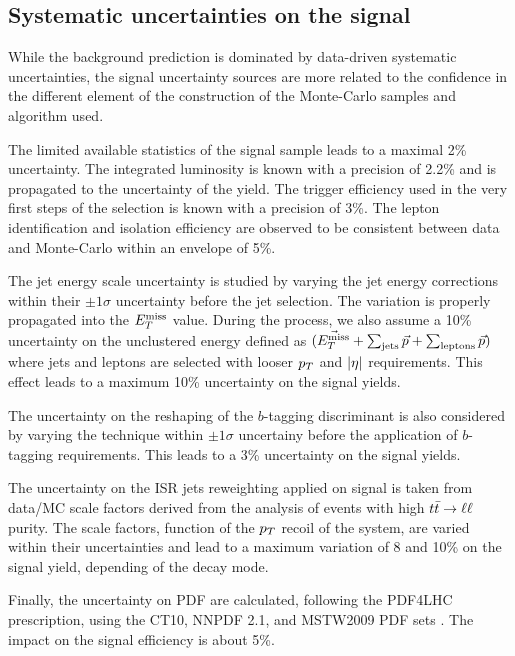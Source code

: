         \subsection{Systematic uncertainties on the signal}

        While the background prediction is dominated by data-driven systematic
        uncertainties, the signal uncertainty sources are more related to the
        confidence in the different element of the construction of the Monte-Carlo
        samples and algorithm used.

        The limited available statistics of the signal sample leads to a maximal
        2\% uncertainty. The integrated luminosity is known with a precision of 2.2\%
        and is propagated to the uncertainty of the yield. The trigger efficiency
        used in the very first steps of the selection is known with a precision of 3\%.
        The lepton identification and isolation efficiency are observed to be consistent
        between data and Monte-Carlo within an envelope of 5\%.

        The jet energy scale uncertainty is studied by varying the jet energy corrections
        within their $\pm1\sigma$ uncertainty before the jet selection. The variation is
        properly propagated into the $E_T^\text{miss}$ value. During the process, we also assume a
        10\% uncertainty on the unclustered energy defined as $(\vec{E_T^\text{miss}} + \sum_\text{jets}
        \vec{p} + \sum_\text{leptons} \vec{p})$ where jets and leptons are selected with looser
        $p_T$ and $\left| \eta \right|$ requirements. This effect leads to a maximum 10\% uncertainty on
        the signal yields.

        The uncertainty on the reshaping of the $b$-tagging discriminant is also considered
        by varying the technique within $\pm1\sigma$ uncertainy before the application of
        $b$-tagging requirements. This leads to a 3\% uncertainty on the signal yields.

        The uncertainty on the ISR jets reweighting applied on signal is taken from data/MC
        scale factors derived from the analysis of events with high $t\bar{t} \rightarrow \ell \ell$ purity. The
        scale factors, function of the $p_T$ recoil of the system, are varied within their
        uncertainties and lead to a maximum variation of 8 and 10\% on the signal yield, depending
        of the decay mode.

        Finally, the uncertainty on PDF are calculated, following the PDF4LHC prescription,
        using the CT10, NNPDF 2.1, and MSTW2009 PDF sets \cite{PDF4LHC}. The impact on the
        signal efficiency is about 5\%.

